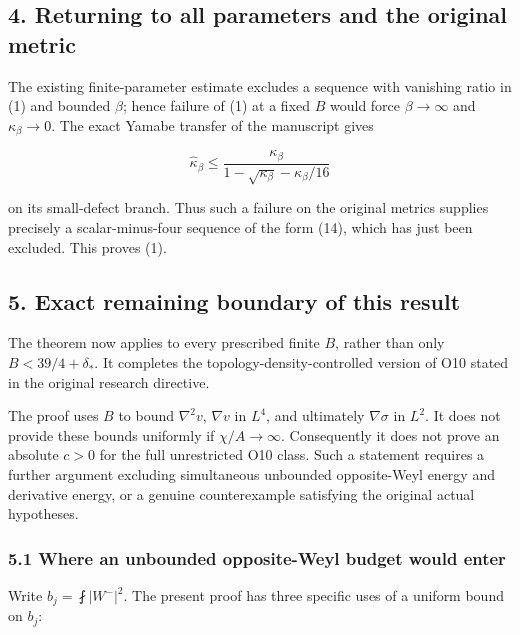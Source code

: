 \documentclass[11pt]{article}
\begin{document}
\hypertarget{returning-to-all-parameters-and-the-original-metric}{%
\subsection{4. Returning to all parameters and the original
metric}\label{returning-to-all-parameters-and-the-original-metric}}

The existing finite-parameter estimate excludes a sequence with
vanishing ratio in (1) and bounded \(\beta\); hence failure of (1) at a
fixed \(B\) would force \(\beta\to\infty\) and \(\kappa_\beta\to0\). The
exact Yamabe transfer of the manuscript gives

\[
 \widehat\kappa_\beta\le
 \frac{\kappa_\beta}{1-\sqrt{\kappa_\beta}-\kappa_\beta/16}
\]

on its small-defect branch. Thus such a failure on the original metrics
supplies precisely a scalar-minus-four sequence of the form (14), which
has just been excluded. This proves (1).

\hypertarget{exact-remaining-boundary-of-this-result}{%
\subsection{5. Exact remaining boundary of this
result}\label{exact-remaining-boundary-of-this-result}}

The theorem now applies to every prescribed finite \(B\), rather than
only \(B<39/4+\delta_*\). It completes the topology-density-controlled
version of O10 stated in the original research directive.

The proof uses \(B\) to bound \(\nabla^2v\), \(\nabla v\) in \(L^4\),
and ultimately \(\nabla\sigma\) in \(L^2\). It does not provide these
bounds uniformly if \(\chi/A\to\infty\). Consequently it does not prove
an absolute \(c>0\) for the full unrestricted O10 class. Such a
statement requires a further argument excluding simultaneous unbounded
opposite-Weyl energy and derivative energy, or a genuine counterexample
satisfying the original actual hypotheses.

\hypertarget{where-an-unbounded-opposite-weyl-budget-would-enter}{%
\subsubsection{5.1 Where an unbounded opposite-Weyl budget would
enter}\label{where-an-unbounded-opposite-weyl-budget-would-enter}}

Write \(b_j=\fint|W^-|^2\). The present proof has three specific uses of
a uniform bound on \(b_j\):
\end{document}
